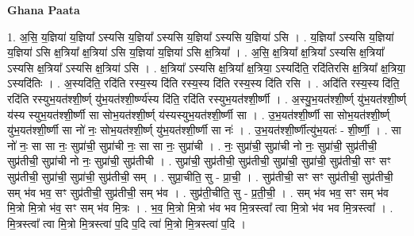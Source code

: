 \documentclass[17pt]{extarticle}
\begin{document}
\textbf{Ghana Paata } \newline

1. अ॒सि॒ य॒ज्ञिया॑ य॒ज्ञिया᳚ ऽस्यसि य॒ज्ञिया᳚ ऽस्यसि य॒ज्ञिया᳚ ऽस्यसि य॒ज्ञिया॑ ऽसि । . य॒ज्ञिया᳚ ऽस्यसि य॒ज्ञिया॑ य॒ज्ञिया॑ ऽसि क्ष॒त्रिया᳚ क्ष॒त्रिया॑ ऽसि य॒ज्ञिया॑ य॒ज्ञिया॑ ऽसि क्ष॒त्रिया᳚ । . अ॒सि॒ क्ष॒त्रिया᳚ क्ष॒त्रिया᳚ ऽस्यसि क्ष॒त्रिया᳚ ऽस्यसि क्ष॒त्रिया᳚ ऽस्यसि क्ष॒त्रिया॑ ऽसि । . क्ष॒त्रिया᳚ ऽस्यसि क्ष॒त्रिया᳚ क्ष॒त्रिया॒ ऽस्यदि॑ति॒ रदि॑तिरसि क्ष॒त्रिया᳚ क्ष॒त्रिया॒ ऽस्यदि॑तिः । . अ॒स्यदि॑ति॒ रदि॑ति रस्य॒स्य दि॑ति रस्य॒स्य दि॑ति रस्य॒स्य दि॑ति रसि । . अदि॑ति रस्य॒स्य दि॑ति॒ रदि॑ति रस्युभ॒यत॑श्शी॒र्ष्ण् यु॑भ॒यत॑श्शी॒र्ष्ण्य॑स्य दि॑ति॒ रदि॑ति रस्युभ॒यत॑श्शी॒र्ष्णी । . अ॒स्यु॒भ॒यत॑श्शी॒र्ष्ण् यु॑भ॒यत॑श्शी॒र्ष्ण् य॑स्य स्युभ॒यत॑श्शी॒र्ष्णी सा सोभ॒यत॑श्शी॒र्ष्ण् य॑स्यस्युभ॒यत॑श्शी॒र्ष्णी सा । . उ॒भ॒यत॑श्शी॒र्ष्णी सा सोभ॒यत॑श्शी॒र्ष्ण् यु॑भ॒यत॑श्शी॒र्ष्णी सा नो॑ नः॒ सोभ॒यत॑श्शी॒र्ष्ण् यु॑भ॒यत॑श्शी॒र्ष्णी सा नः॑ । . उ॒भ॒यत॑श्शी॒र्ष्णीत्यु॑भ॒यतः॑ - शी॒र्ष्णी॒ । . सा नो॑ नः॒ सा सा नः॒ सुप्रा॑ची॒ सुप्रा॑ची नः॒ सा सा नः॒ सुप्रा॑ची । . नः॒ सुप्रा॑ची॒ सुप्रा॑ची नो नः॒ सुप्रा॑ची॒ सुप्र॑तीची॒ सुप्र॑तीची॒ सुप्रा॑ची नो नः॒ सुप्रा॑ची॒ सुप्र॑तीची । . सुप्रा॑ची॒ सुप्र॑तीची॒ सुप्र॑तीची॒ सुप्रा॑ची॒ सुप्रा॑ची॒ सुप्र॑तीची॒ सꣳ सꣳ सुप्र॑तीची॒ सुप्रा॑ची॒ सुप्रा॑ची॒ सुप्र॑तीची॒ सम् । . सुप्रा॒चीति॒ सु - प्रा॒ची॒ । . सुप्र॑तीची॒ सꣳ सꣳ सुप्र॑तीची॒ सुप्र॑तीची॒ सम् भ॑व भव॒ सꣳ सुप्र॑तीची॒ सुप्र॑तीची॒ सम् भ॑व । . सुप्र॑ती॒चीति॒ सु - प्र॒ती॒ची॒ । . सम् भ॑व भव॒ सꣳ सम् भ॑व मि॒त्रो मि॒त्रो भ॑व॒ सꣳ सम् भ॑व मि॒त्रः । . भ॒व॒ मि॒त्रो मि॒त्रो भ॑व भव मि॒त्रस्त्वा᳚ त्वा मि॒त्रो भ॑व भव मि॒त्रस्त्वा᳚ । . मि॒त्रस्त्वा᳚ त्वा मि॒त्रो मि॒त्रस्त्वा॑ प॒दि प॒दि त्वा॑ मि॒त्रो मि॒त्रस्त्वा॑ प॒दि । \newline
\end{document}
